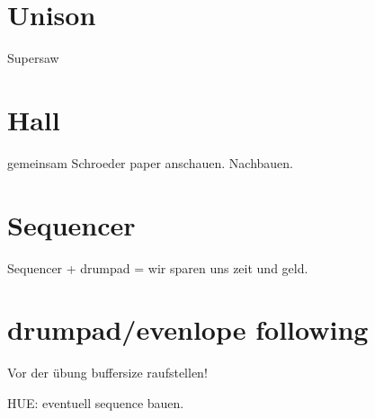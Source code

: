 \section{Unison}
Supersaw
\section{Hall}
gemeinsam Schroeder paper anschauen. Nachbauen.

\section{Sequencer}
Sequencer + drumpad = wir sparen uns zeit und geld.
\section{drumpad/evenlope following}
Vor der übung buffersize raufstellen!

HUE: eventuell sequence bauen.
